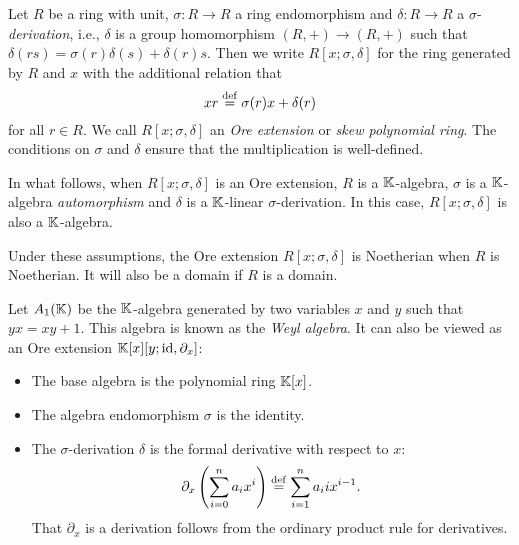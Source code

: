\begin{definition}
	Let $R$ be a ring with unit, $\sigma \colon R \to R$ a ring endomorphism and
	$\delta \colon R \to R$ a $\sigma$-\emph{derivation}, i.e.,
	$\delta$ is a group homomorphism $(R, +) \to (R, +)$ such that $\delta (r s) =
		\sigma(r)\delta(s) + \delta(r) s$. Then we write $R[x;\sigma, \delta]$ for the ring generated by $R$ and $x$ with the additional relation that
	\begin{equation*}
		x r \overset{\mathrm{def}}{=} \sigma(r) x + \delta(r)
	\end{equation*}
	for all $r \in R$. We call $R[x;\sigma, \delta]$ an \emph{Ore extension} or \emph{skew polynomial ring}. The conditions
	on $\sigma$ and $\delta$ ensure that the multiplication is well-defined.
\end{definition}
%
\begin{convention}
	In what follows, when $R[x;\sigma, \delta]$ is an Ore extension, $R$ is a
	$\mathbb{K}$-algebra, $\sigma$ is a $\mathbb{K}$-algebra \emph{automorphism} and $\delta$ is a
	$\mathbb{K}$-linear $\sigma$-derivation. In this case, $R[x;\sigma, \delta]$ is also a
	$\mathbb{K}$-algebra.
\end{convention}
%
Under these assumptions, the Ore extension $R[x; \sigma, \delta]$ is Noetherian when
$R$ is Noetherian. It will also be a domain if $R$ is a domain.

\begin{example}
	Let $A_1(\mathbb{K})$ be the $\mathbb{K}$-algebra generated by two variables $x$ and $y$ such that $yx =
		xy + 1$. This algebra is known as the \emph{Weyl algebra}. It can
	also be viewed as an Ore extension $\mathbb{K}[x][y; \operatorname{id}, \partial_x]$:
	\begin{itemize}
		\item The base algebra is the polynomial ring $\mathbb{K}[x]$.
		\item The algebra endomorphism $\sigma$ is the identity.
		\item The $\sigma$-derivation $\delta$ is the formal derivative with respect to $x$:
		      \begin{equation*}
			      \partial_x \left(\sum_{i=0}^n a_i x^i \right) \overset{\mathrm{def}}{=} \sum_{i=1}^{n} a_i i x^{i-1}.
		      \end{equation*}
		      That $\partial_x$ is a derivation follows from the ordinary product rule for derivatives.
	\end{itemize}
\end{example}

